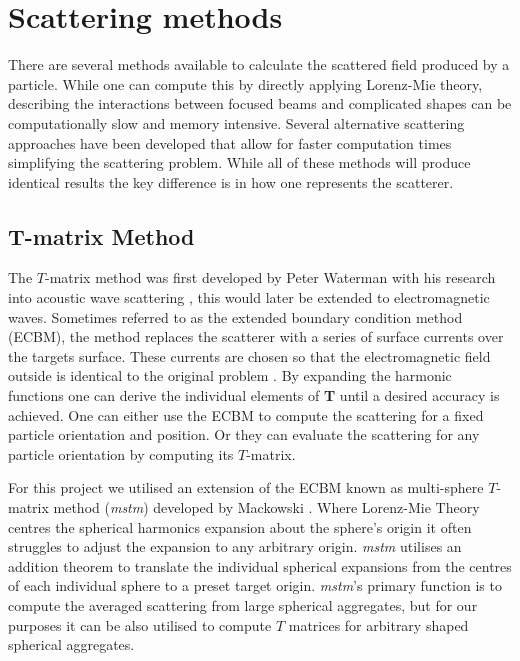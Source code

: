 \section{Scattering methods}
\label{sec:scattering}
There are several methods available to calculate the scattered 
field produced by a particle. While one can compute this by 
directly applying Lorenz-Mie theory, describing the interactions 
between focused beams and complicated shapes can be computationally 
slow and memory intensive. Several alternative scattering approaches 
have been developed that allow for faster computation times 
simplifying the scattering problem. While all of these methods will
produce identical results the key difference is in how one represents
the scatterer.
\subsection{T-matrix Method}

The $T$-matrix method was first developed by Peter Waterman with 
his research into acoustic wave scattering \cite{Waterman1969}, 
this would later be extended to electromagnetic waves. Sometimes 
referred to as the extended boundary condition method (ECBM), the 
method replaces the scatterer with a series of surface currents 
over the targets surface. These currents are chosen so that the 
electromagnetic field outside is identical to the original problem \cite{Wriedt1998}. By expanding the harmonic functions one can 
derive the individual elements of \textbf{T} until a desired 
accuracy is achieved. One can either use the ECBM to compute the 
scattering for a fixed particle orientation and position. Or they
can evaluate the scattering for any particle orientation by 
computing its $T$-matrix.

For this project we utilised an extension of the ECBM known as 
multi-sphere $T$-matrix method (\textit{mstm}) developed by 
Mackowski \cite{Mackowski2011}. Where Lorenz-Mie Theory centres
the spherical harmonics expansion about the sphere's origin it
often struggles to adjust the expansion to any arbitrary origin.
\textit{mstm} utilises an addition theorem to translate the 
individual spherical expansions from the centres of each 
individual sphere to a preset target origin. \textit{mstm}'s 
primary function is to compute the averaged scattering from 
large spherical aggregates, but for our purposes it can be
also utilised to compute $T$ matrices for arbitrary shaped
spherical aggregates.

